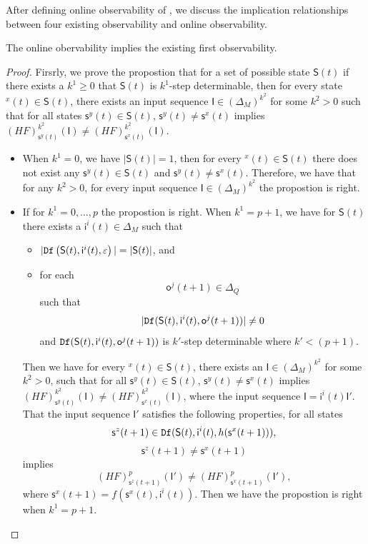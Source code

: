 After defining online observability of \BCNs, we discuss the implication relationships between four existing observability and online observability.
\begin{lemma}
The online obervability implies the existing first observability.
\label{lemm:3}
\end{lemma}
\begin{proof} Firsrly, we prove the propostion that for a set of possible state $\mathsf{S}(t)$ if there exists a $k^{1}\ge 0$ that $\mathsf{S}(t)$ is $k^{1}$-step determinable, then for every state \State$^{x}(t)\in \mathsf{S}(t)$, there exists an input sequence $\mathsf{I}\in(\Delta_M)^{k^2}$ for some $k^2 >0$ such that for all states $\mathsf{s}^{y}(t)\in \mathsf{S}(t)$, $\mathsf{s}^{y}(t)\neq \mathsf{s}^{x}(t)$ implies $(HF)^{k^2}_{\mathsf{s}^{y}(t)}(\mathsf{I})\neq (HF)^{k^2}_{{\mathsf{s}^{x}(t)}}(\mathsf{I})$.
\begin{itemize}
\item When $k^{1}=0$, we have $|\mathsf{S}(t)|=1$, then for every \State$^{x}(t)$$\in \mathsf{S}(t)$ there does not exist any $\mathsf{s}^{y}(t)\in \mathsf{S}(t)$ and $\mathsf{s}^{y}(t)\neq \mathsf{s}^{x}(t)$. Therefore, we have that for any $k^2 >0$, for every input sequence $\mathsf{I}\in(\Delta_M)^{k^2}$ the propostion is right. 
\item If for $k^{1}=0,\ldots, p$ the propostion is right. When $k^{1}=p+1$, we have for $\mathsf{S}(t)$ there exists a $\mathsf{i}^{i}(t)\in \Delta_M$ such that
 \begin{itemize}
 \item  $|{\tt Df}\left(\mathsf{S}(t),\mathsf{i}^{i}(t),\varepsilon\right)|=|\mathsf{S}(t)|$, and 
 \item  for each \[\mathsf{o}^{j}(t+1)\in \Delta_Q\] such that \[|{\tt Df}(\mathsf{S}(t),\mathsf{i}^{i}(t),\mathsf{o}^{j}(t+1))|\neq 0\] and ${\tt Df}(\mathsf{S}(t),\mathsf{i}^{i}(t),\mathsf{o}^{j}(t+1))$ is $k'$-step determinable where ${k'}<(p+1)$.
 \end{itemize}
 Then we have for every \State$^{x}(t)$$\in \mathsf{S}(t)$, there exists an $\mathsf{I}\in(\Delta_M)^{k^2}$ for some $k^2 >0$, such that for all $\mathsf{s}^{y}(t)\in \mathsf{S}(t)$, $\mathsf{s}^{y}(t)\neq \mathsf{s}^{x}(t)$ implies $(HF)^{k^2}_{\mathsf{s}^{y}(t)}(\mathsf{I})\neq (HF)^{k^2}_{{\mathsf{s}^{x}(t)}}(\mathsf{I})$, where the input sequence $\mathsf{I}=\mathsf{i}^{i}(t)\mathsf{I}'$. That the input sequence $\mathsf{I}'$ satisfies the following properties,
  for all states \[\mathsf{s}^{z}(t+1)\in {\tt Df}(\mathsf{S}(t),\mathsf{i}^{i}(t),h(\mathsf{s}^{x}(t+1))),\]\[\mathsf{s}^{z}(t+1)\neq \mathsf{s}^{x}(t+1)\] implies \[(HF)^p_{\mathsf{s}^{z}(t+1)}(\mathsf{I}')\neq (HF)^p_{{\mathsf{s}^{x}(t+1)}}(\mathsf{I}'),\] where $\mathsf{s}^{x}(t+1)=f(\mathsf{s}^{x}(t),\mathsf{i}^{i}(t))$. Then we have the propostion is right when $k^{1}=p+1$. 


\end{itemize}
\end{proof}
